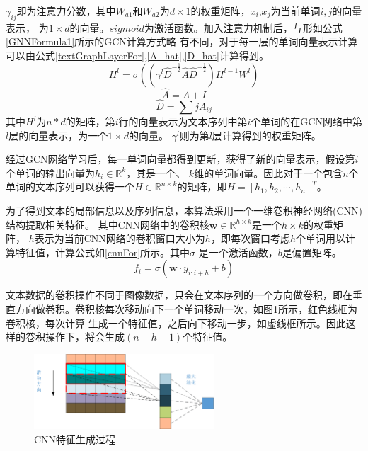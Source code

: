 $\gamma_{ij}$即为注意力分数，其中$W_{a1}$和$W_{a2}$为$d\times 1$的权重矩阵，$x_i$,$x_j$为当前单词$i,j$的向量表示，
为$1\times d$的向量。$sigmoid$为激活函数。加入注意力机制后，与形如公式\ref{GNNFormula1}所示的GCN计算方式略
有不同，对于每一层的单词向量表示计算可以由公式\ref{textGraphLayerFor},\ref{A_hat},\ref{D_hat}计算得到。
\begin{equation}\label{textGraphLayerFor}
    H^l=\sigma((\gamma ^l\hat{D}^{-\frac{1}{2}}\hat{A}\hat{D}^{-\frac{1}{2}})H^{l-1}W^l)
\end{equation}
\begin{equation}\label{A_hat}
    \hat{A} = A+I
\end{equation}
\begin{equation}\label{D_hat}
    \hat{D} = \sum{j}A_{ij}
\end{equation}
其中$H^l$为$n*d$的矩阵，第$i$行的向量表示为文本序列中第$i$个单词的在GCN网络中第$l$层的向量表示，为一个$1\times d$的向量。
$\gamma ^l$则为第$l$层计算得到的权重矩阵。

经过GCN网络学习后，每一单词向量都得到更新，获得了新的向量表示，假设第$i$个单词的输出向量为$h_i\in \mathbb{R}^k$，其是一个、
$k$维的单词向量。因此对于一个包含$n$个单词的文本序列可以获得一个$H\in \mathbb{R}^{n\times k}$的矩阵，即$H=[h_1, h_2,\cdots, h_n]^T$。

为了得到文本的局部信息以及序列信息，本算法采用一个一维卷积神经网络(CNN)结构提取相关特征。
其中CNN网络中的卷积核$\mathbf{w} \in \mathbb{R}^{h\times k}$是一个$h \times k$的权重矩阵，
$h$表示为当前CNN网络的卷积窗口大小为$h$，即每次窗口考虑$h$个单词用以计算特征值，计算公式如\ref{cnnFor}所示。其中$\sigma$
是一个激活函数，$b$是偏置矩阵。
\begin{equation}\label{cnnFor}
    f_i=\sigma(\mathbf{w} \cdot y_{i:i+h}+b)
\end{equation}

文本数据的卷积操作不同于图像数据，只会在文本序列的一个方向做卷积，即在垂直方向做卷积。卷积核每次移动向下一个单词移动一次，如图\ref{cnnslide}所示，红色线框为卷积核，每次计算
生成一个特征值，之后向下移动一步，如虚线框所示。因此这样的卷积操作下，将会生成$(n-h+1)$个特征值。
\begin{figure}[htb]
    \setlength{\belowcaptionskip}{0pt}
    \centering
    \includegraphics[width=0.6\textwidth]{pic/cnnslide.png}
    \caption{CNN特征生成过程}
    \label{cnnslide}
\end{figure}

